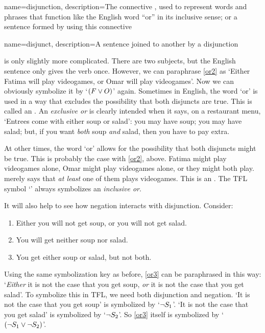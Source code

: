 {
name=disjunction,
description={The connective \eor, used to represent words and phrases that function like the English word ``or'' in its inclusive sense; or a sentence formed by using this connective}
}

{
name=disjunct,
description={A sentence joined to another by a \gls{disjunction}}
}

 is only slightly more complicated. There are two subjects, but the English sentence only gives the verb once. However, we can paraphrase \cref*{or2} as `Either Fatima will play videogames, or Omar will play videogames'. Now we can obviously symbolize it by `$(F \vee O)$' again.
Sometimes in English, the word `or' is used in a way that excludes the possibility that both disjuncts are true. This is called an .  An \emph{exclusive or} is clearly intended when it says, on a restaurant menu, `Entrees come with either soup or salad': you may have soup; you may have salad; but, if you want \emph{both} soup \emph{and} salad, then you have to pay extra.

At other times, the word `or' allows for the possibility that both disjuncts might be true. This is probably the case with \cref{or2}, above. Fatima might play videogames alone, Omar might play videogames alone, or they might both play.  merely says that \emph{at least} one of them plays videogames. This is an . The TFL symbol `\eor' always symbolizes an \emph{inclusive or}.

It will also help to see how negation interacts with disjunction. Consider: 
	\begin{enumerate}
		\item\label{or3} Either you will not get soup, or you will not get salad.
		\item\label{or4} You will get neither soup nor salad.
		\item\label{or.xor} You get either soup or salad, but not both.
	\end{enumerate}
Using the same symbolization key as before, \cref*{or3} can be paraphrased in this way: `\emph{Either} it is not the case that you get soup, \emph{or} it is not the case that you get salad'. To symbolize this in TFL, we need both disjunction and negation. `It is not the case that you get soup' is symbolized by `$\neg S_1$'. `It is not the case that you get salad' is symbolized by `$\neg S_2$'. So \cref*{or3} itself is symbolized by `$(\neg S_1 \vee \neg S_2)$'.

